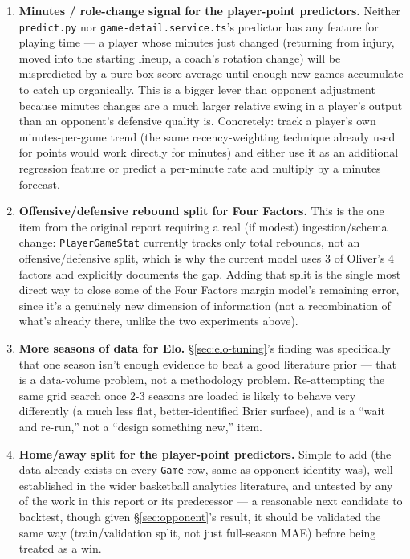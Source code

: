 \documentclass[11pt]{article}
\newcommand{\code}[1]{\allowbreak\texttt{\small #1}\allowbreak}
\begin{document}
\begin{enumerate}
    \item \textbf{Minutes / role-change signal for the player-point predictors.} Neither
    \code{predict.py} nor \code{game-detail.service.ts}'s predictor has any feature for playing time — a
    player whose minutes just changed (returning from injury, moved into the starting lineup, a coach's
    rotation change) will be mispredicted by a pure box-score average until enough new games accumulate to
    catch up organically. This is a bigger lever than opponent adjustment because minutes changes are a much
    larger relative swing in a player's output than an opponent's defensive quality is. Concretely: track a
    player's own minutes-per-game trend (the same recency-weighting technique already used for points would
    work directly for minutes) and either use it as an additional regression feature or predict a
    per-minute rate and multiply by a minutes forecast.
    \item \textbf{Offensive/defensive rebound split for Four Factors.} This is the one item from the
    original report requiring a real (if modest) ingestion/schema change: \code{PlayerGameStat} currently
    tracks only total rebounds, not an offensive/defensive split, which is why the current model uses 3 of
    Oliver's 4 factors and explicitly documents the gap. Adding that split is the single most direct way to
    close some of the Four Factors margin model's remaining error, since it's a genuinely new dimension of
    information (not a recombination of what's already there, unlike the two experiments above).
    \item \textbf{More seasons of data for Elo.} \S\ref{sec:elo-tuning}'s finding was specifically that one
    season isn't enough evidence to beat a good literature prior — that is a data-volume problem, not a
    methodology problem. Re-attempting the same grid search once 2-3 seasons are loaded is likely to behave
    very differently (a much less flat, better-identified Brier surface), and is a ``wait and re-run,'' not
    a ``design something new,'' item.
    \item \textbf{Home/away split for the player-point predictors.} Simple to add (the data already exists
    on every \code{Game} row, same as opponent identity was), well-established in the wider basketball
    analytics literature, and untested by any of the work in this report or its predecessor — a reasonable
    next candidate to backtest, though given \S\ref{sec:opponent}'s result, it should be validated the same
    way (train/validation split, not just full-season MAE) before being treated as a win.
\end{enumerate}
\end{document}
